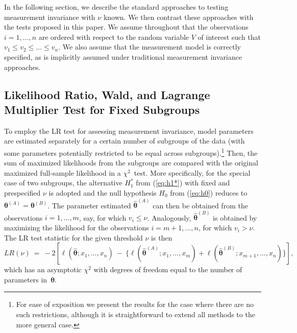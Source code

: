\documentclass[man]{apa}
\begin{document}
In the following section, we describe the standard approaches to
testing measurement invariance with $\nu$ known.  We then contrast
these approaches with the tests proposed in this paper.
We assume throughout that the observations $i = 1, \dots, n$ are
ordered with respect to the random variable $V$ of interest such that
$v_1 \le v_2 \le \dots \le v_n$.  We also assume that the measurement
model is correctly specified, as is implicitly assumed under traditional
measurement invariance approaches.


\subsection{Likelihood Ratio, Wald, and Lagrange Multiplier Test for Fixed Subgroups}

To employ the LR test for assessing measurement invariance, model
parameters are estimated separately for a certain number of subgroups
of the data (with some parameters potentially restricted to be equal across
subgroups).\footnote{For ease of exposition we present
the results for the case where there are no such restrictions, although it is
straightforward to extend all methods to the more general case.}
Then, the sum of maximized likelihoods 
from the subgroups are compared with the original maximized full-sample likelihood
in a $\chi^2$~test. More specifically, for the special case of two subgroups,
the alternative $H_1^*$ from (\ref{eq:h1*}) with fixed and prespecified $\nu$ is adopted
and the null hypothesis $H_0$ from (\ref{eq:h0}) reduces to ${\bm \theta}^{(A)} = {\bm \theta}^{(B)}$.
The parameter estimated $\hat {\bm \theta}^{(A)}$ can then be obtained from the
observations $i = 1, \dots, m$, say, for which $v_i \le \nu$. Analogously,
$\hat {\bm \theta}^{(B)}$ is obtained by maximizing the likelihood for the
observations $i = m + 1, \dots, n$, for which $v_i > \nu$. The LR test statistic
for the given threshold $\nu$ is then
\begin{equation} \label{eq:lr}
  \mathit{LR}(\nu) ~=~ -2 \left[
         \ell(\hat {\bm \theta}; x_1, \dots, x_n)
   ~-~ \{\ell(\hat {\bm \theta}^{(A)}; x_1, \dots, x_m)
    +    \ell(\hat {\bm \theta}^{(B)}; x_{m+1}, \dots, x_n)\}
    \right],
\end{equation}
which has an asymptotic $\chi^2$ with degrees of freedom equal to the number
of parameters in~${\bm \theta}$.
\end{document}
